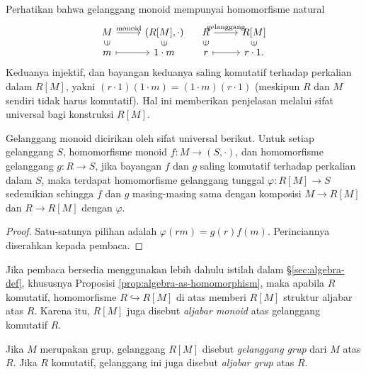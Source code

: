 Perhatikan bahwa gelanggang monoid mempunyai homomorfisme natural
\[\begin{tikzcd}[row sep=tiny]
	M \arrow[r, "\text{monoid}"] & (R[M], \cdot) \\
	m \arrow[mapsto, r] \arrow[phantom, u, sloped, "\in" description] & 1 \cdot m \arrow[phantom, u, sloped, "\in" description]
\end{tikzcd} \quad
\begin{tikzcd}[row sep=tiny]
	R \arrow[r, "\text{gelanggang}"] & R[M] \\
	r \arrow[mapsto, r] \arrow[phantom, u, sloped, "\in" description] & r \cdot 1. \arrow[phantom, u, sloped, "\in" description]
\end{tikzcd}\]
Keduanya injektif, dan bayangan keduanya saling komutatif terhadap perkalian dalam $R[M]$, yakni $(r \cdot 1)(1 \cdot m) = (1 \cdot m)(r \cdot 1)$ (meskipun $R$ dan $M$ sendiri tidak harus komutatif). Hal ini memberikan penjelasan melalui sifat universal bagi konstruksi $R[M]$.

\begin{proposition}\label{prop:monoid-ring-universal}
	Gelanggang monoid dicirikan oleh sifat universal berikut. Untuk setiap gelanggang $S$, homomorfisme monoid $f: M \to (S, \cdot)$, dan homomorfisme gelanggang $g: R \to S$, jika bayangan $f$ dan $g$ saling komutatif terhadap perkalian dalam $S$, maka terdapat homomorfisme gelanggang tunggal $\varphi: R[M] \to S$ sedemikian sehingga $f$ dan $g$ masing-masing sama dengan komposisi $M \to R[M]$ dan $R \to R[M]$ dengan $\varphi$.
\end{proposition}
\begin{proof}
	Satu-satunya pilihan adalah $\varphi(rm) = g(r)f(m)$. Perinciannya diserahkan kepada pembaca.
\end{proof}

Jika pembaca bersedia menggunakan lebih dahulu istilah dalam \S\ref{sec:algebra-def}, khususnya Proposisi \ref{prop:algebra-as-homomorphism}, maka apabila $R$ komutatif, homomorfisme $R \hookrightarrow R[M]$ di atas memberi $R[M]$ struktur aljabar atas $R$. Karena itu, $R[M]$ juga disebut \emph{aljabar monoid} atas gelanggang komutatif $R$.

\begin{definition}\label{def:group-ring}
	Jika $M$ merupakan grup, gelanggang $R[M]$ disebut \emph{gelanggang grup} dari $M$ atas $R$. Jika $R$ komutatif, gelanggang ini juga disebut \emph{aljabar grup} atas $R$.
\end{definition}

